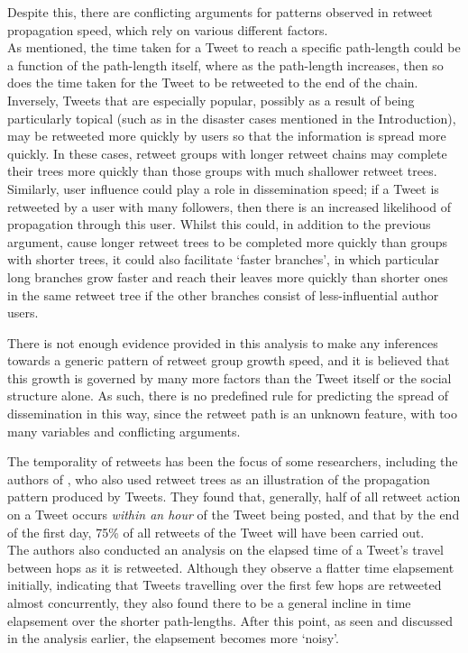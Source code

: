 Despite this, there are conflicting arguments for patterns observed in retweet propagation speed, which rely on various different factors.\\
As mentioned, the time taken for a Tweet to reach a specific path-length could be a function of the path-length itself, where as the path-length increases, then so does the time taken for the Tweet to be retweeted to the end of the chain.\\
Inversely, Tweets that are especially popular, possibly as a result of being particularly topical (such as in the disaster cases mentioned in the Introduction), may be retweeted more quickly by users so that the information is spread more quickly. In these cases, retweet groups with longer retweet chains may complete their trees more quickly than those groups with much shallower retweet trees.\\
Similarly, user influence could play a role in dissemination speed; if a Tweet is retweeted by a user with many followers, then there is an increased likelihood of propagation through this user. Whilst this could, in addition to the previous argument, cause longer retweet trees to be completed more quickly than groups with shorter trees, it could also facilitate `faster branches', in which particular long branches grow faster and reach their leaves more quickly than shorter ones in the same retweet tree if the other branches consist of less-influential author users.

There is not enough evidence provided in this analysis to make any inferences towards a generic pattern of retweet group growth speed, and it is believed that this growth is governed by many more factors than the Tweet itself or the social structure alone. As such, there is no predefined rule for predicting the spread of dissemination in this way, since the retweet path is an unknown feature, with too many variables and conflicting arguments.

The temporality of retweets has been the focus of some researchers, including the authors of \cite{kwak10}, who also used retweet trees as an illustration of the propagation pattern produced by Tweets. They found that, generally, half of all retweet action on a Tweet occurs \textit{within an hour} of the Tweet being posted, and that by the end of the first day, 75\% of all retweets of the Tweet will have been carried out.\\
The authors also conducted an analysis on the elapsed time of a Tweet's travel between hops as it is retweeted. Although they observe a flatter time elapsement initially, indicating that Tweets travelling over the first few hops are retweeted almost concurrently, they also found there to be a general incline in time elapsement over the shorter path-lengths. After this point, as seen and discussed in the analysis earlier, the elapsement becomes more `noisy'. 

